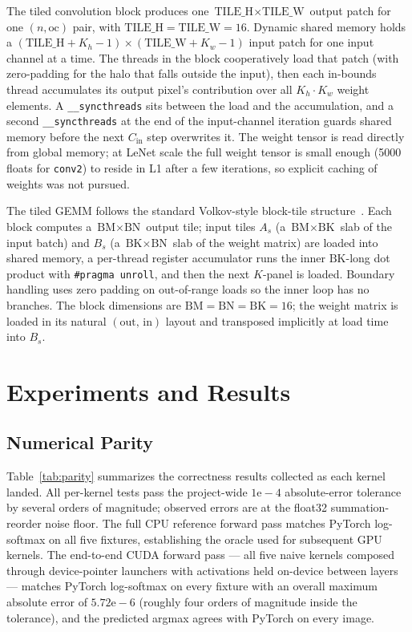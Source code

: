 \documentclass[conference]{IEEEtran}
\begin{document}
The tiled convolution block produces one $\text{TILE\_H}\times
\text{TILE\_W}$ output patch for one $(n,\text{oc})$ pair, with
$\text{TILE\_H}=\text{TILE\_W}=16$. Dynamic shared memory holds a
$(\text{TILE\_H}+K_h-1)\times(\text{TILE\_W}+K_w-1)$ input patch for
one input channel at a time. The threads in the block cooperatively
load that patch (with zero-padding for the halo that falls outside
the input), then each in-bounds thread accumulates its output pixel's
contribution over all $K_h\cdot K_w$ weight elements. A
\texttt{\_\_syncthreads} sits between the load and the accumulation,
and a second \texttt{\_\_syncthreads} at the end of the input-channel
iteration guards shared memory before the next $C_{\text{in}}$ step
overwrites it. The weight tensor is read directly from global memory;
at LeNet scale the full weight tensor is small enough (5000 floats
for \texttt{conv2}) to reside in L1 after a few iterations, so
explicit caching of weights was not pursued.

The tiled GEMM follows the standard Volkov-style
block-tile structure~\cite{volkov2008}. Each block
computes a $\text{BM}\times\text{BN}$ output tile; input tiles
$A_s$ (a $\text{BM}\times\text{BK}$ slab of the input batch) and
$B_s$ (a $\text{BK}\times\text{BN}$ slab of the weight matrix) are
loaded into shared memory, a per-thread register accumulator runs the
inner $\text{BK}$-long dot product with \texttt{\#pragma unroll}, and
then the next $K$-panel is loaded. Boundary handling uses zero
padding on out-of-range loads so the inner loop has no branches. The
block dimensions are $\text{BM}=\text{BN}=\text{BK}=16$; the weight
matrix is loaded in its natural $(\text{out},\,\text{in})$ layout
and transposed implicitly at load time into $B_s$.

\section{Experiments and Results}

\subsection{Numerical Parity}
Table~\ref{tab:parity} summarizes the correctness results collected as
each kernel landed. All per-kernel tests pass the project-wide
$1\mathrm{e}{-}4$ absolute-error tolerance by several orders of
magnitude; observed errors are at the float32 summation-reorder noise
floor. The full CPU reference forward pass matches PyTorch log-softmax
on all five fixtures, establishing the oracle used for subsequent GPU
kernels. The end-to-end CUDA forward pass — all five naive kernels
composed through device-pointer launchers with activations held
on-device between layers — matches PyTorch log-softmax on every
fixture with an overall maximum absolute error of $5.72\mathrm{e}{-}6$
(roughly four orders of magnitude inside the tolerance), and the
predicted argmax agrees with PyTorch on every image. 
\end{document}
